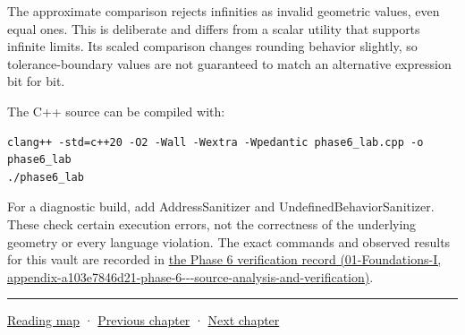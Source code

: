 The approximate comparison rejects infinities as invalid geometric values, even equal ones. This is deliberate and differs from a scalar utility that supports infinite limits. Its scaled comparison changes rounding behavior slightly, so tolerance-boundary values are not guaranteed to match an alternative expression bit for bit.

The C++ source can be compiled with:

\begin{verbatim}
clang++ -std=c++20 -O2 -Wall -Wextra -Wpedantic phase6_lab.cpp -o phase6_lab
./phase6_lab
\end{verbatim}

For a diagnostic build, add AddressSanitizer and UndefinedBehaviorSanitizer. These check certain execution errors, not the correctness of the underlying geometry or every language violation. The exact commands and observed results for this vault are recorded in \href{../01-Foundations-I/main.pdf\#nameddest=appendix-a103e7846d21-phase-6---source-analysis-and-verification}{the Phase 6 verification record (01-Foundations-I, appendix-a103e7846d21-phase-6-\/-\/-source-analysis-and-verification)}.

\begin{center}\rule{0.5\linewidth}{0.5pt}\end{center}

\hyperref[volume-reading-map]{Reading map} · \hyperref[02-foundations-ii-ch036-exposure-physical-optics-and-depth-of-field]{Previous chapter} · \hyperref[02-foundations-ii-ch038-reconstruct-the-complete-geometry-pipeline]{Next chapter}
